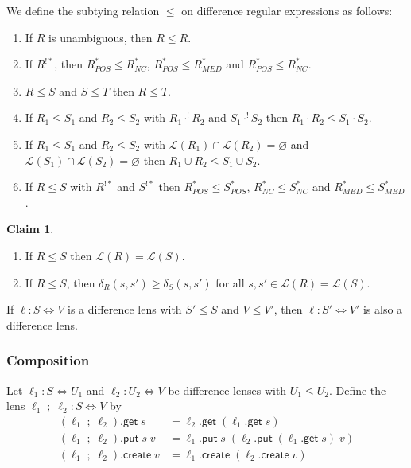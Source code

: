 \documentclass[acmsmall,review,anonymous]{acmart}\settopmatter{printfolios=true,printccs=false,printacmref=false}
\theoremstyle{definition}
\newtheorem{claim}{Claim}
\newcommand{\kw}[1]{\ensuremath{\mathsf{#1}}\xspace}
\newcommand{\get}{\ensuremath{\kw{get}}\xspace}
\newcommand{\pput}{\ensuremath{\kw{put}}\xspace}
\newcommand{\create}{\ensuremath{\kw{create}}\xspace}
\begin{document}
We define the subtying relation $\leq$ on difference regular expressions as follows:
\begin{enumerate}
\item
If $R$ is unambiguous, then $R \leq R$.
\item
If $R^{!*}$, then $R^*_{POS} \leq R^*_{NC}$, $R^*_{POS} \leq R^*_{MED}$ and $R^*_{POS} \leq R^*_{NC}$.
\item $R \leq S$ and $S \leq T$ then $R \leq T$.
\item If $R_1 \leq S_1$ and $R_2 \leq S_2$ with $R_1 \cdot ^! R_2$ and $S_1 \cdot^! S_2$ then $R_1 \cdot R_2 \leq S_1 \cdot S_2$.
\item If $R_1 \leq S_1$ and $R_2 \leq S_2$ with $\mathcal{L}(R_1) \cap \mathcal{L}(R_2) = \varnothing$ and $\mathcal{L}(S_1) \cap \mathcal{L}(S_2) = \varnothing$ then $R_1 \cup R_2 \leq S_1 \cup S_2$.
\item
If $R \leq S$ with $R^{!*}$ and $S^{!*}$ then $R^*_{POS} \leq S^*_{POS}$, $R^*_{NC} \leq S^*_{NC}$ and $R^*_{MED} \leq S^*_{MED}$.
\end{enumerate}
\begin{claim}
\begin{enumerate}
\item
If $R \leq S$ then $\mathcal{L}(R) = \mathcal{L}(S)$.
\item
If $R \leq S$, then $\delta_R(s, s') \geq \delta_S(s, s')$ for all $s, s' \in \mathcal{L}(R) = \mathcal{L}(S)$.
\end{enumerate}
\begin{corollary}
If $\ell : S \Leftrightarrow V$ is a difference lens with $S' \leq S$ and $V \leq V'$, then $\ell : S' \Leftrightarrow V'$ is also a difference lens.
\end{corollary}
\end{claim}
\subsubsection{Composition}
Let $\ell_1 : S \Leftrightarrow U_1$ and $\ell_2 : U_2 \Leftrightarrow V$ be difference lenses with $U_1 \leq U_2$. Define the lens $\ell_1 \; ; \; \ell_2 : S \Leftrightarrow V$ by
\begin{align*}
(\ell_1 \; ; \; \ell_2).\get \; s &= \ell_2.\get \; (\ell_1.\get \; s)\\
(\ell_1 \; ; \; \ell_2).\pput \; s \; v &= \ell_1.\pput \; s \; (\ell_2.\pput \;
(\ell_1.\get \; s) \; v) \\
(\ell_1 \; ; \; \ell_2).\create \; v &= \ell_1.\create \; (\ell_2.\create \; v)
\end{align*}
\end{document}
